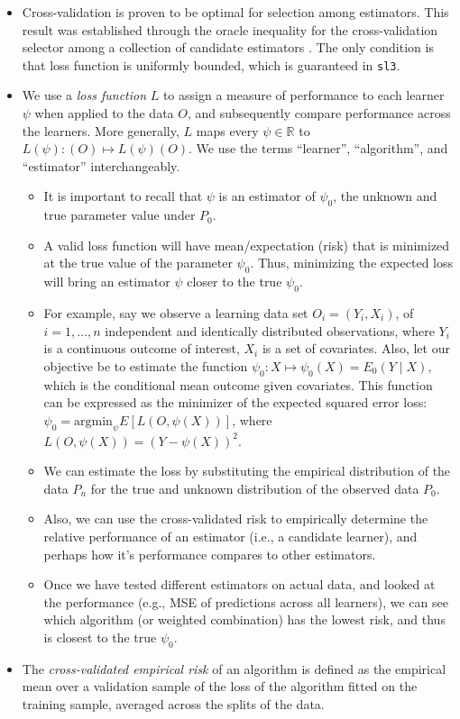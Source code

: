 \documentclass[12pt, krantz2,]{krantz}
\providecommand{\tightlist}{%
  \setlength{\itemsep}{0pt}\setlength{\parskip}{0pt}}
\theoremstyle{definition}
\theoremstyle{definition}
\theoremstyle{definition}
\newcommand{\R}{\mathbb{R}}
\newcommand{\1}{\mathbbm{1}}
\begin{document}
\begin{itemize}
\item
  Cross-validation is proven to be optimal for selection among estimators. This
  result was established through the oracle inequality for the cross-validation
  selector among a collection of candidate estimators \citep{vdl2003unified, vaart2006oracle}. The only condition is that loss function is uniformly
  bounded, which is guaranteed in \texttt{sl3}.
\item
  We use a \emph{loss function} \(L\) to assign a measure of performance to each
  learner \(\psi\) when applied to the data \(O\), and subsequently compare
  performance across the learners. More generally, \(L\) maps every \(\psi \in \R\)
  to \(L(\psi) : (O) \mapsto L(\psi)(O)\). We use the terms ``learner'',
  ``algorithm'', and ``estimator'' interchangeably.

  \begin{itemize}
  \tightlist
  \item
    It is important to recall that \(\psi\) is an estimator of \(\psi_0\), the
    unknown and true parameter value under \(P_0\).
  \item
    A valid loss function will have mean/expectation (risk) that is minimized
    at the true value of the parameter \(\psi_0\). Thus, minimizing the expected
    loss will bring an estimator \(\psi\) closer to the true \(\psi_0\).
  \item
    For example, say we observe a learning data set \(O_i=(Y_i,X_i)\), of
    \(i=1, \ldots, n\) independent and identically distributed observations,
    where \(Y_i\) is a continuous outcome of interest, \(X_i\) is a set of
    covariates. Also, let our objective be to estimate the function \(\psi_0: X \mapsto \psi_0(X) = E_0(Y \mid X)\), which is the conditional mean outcome
    given covariates. This function can be expressed as the minimizer of the
    expected squared error loss: \(\psi_0 = \text{argmin}_{\psi} E[L(O,\psi(X))]\), where \(L(O, \psi(X)) = (Y - \psi(X))^2\).
  \item
    We can estimate the loss by substituting the empirical distribution of
    the data \(P_n\) for the true and unknown distribution of the observed data
    \(P_0\).
  \item
    Also, we can use the cross-validated risk to empirically determine the
    relative performance of an estimator (i.e., a candidate learner), and
    perhaps how it's performance compares to other estimators.
  \item
    Once we have tested different estimators on actual data, and looked at
    the performance (e.g., MSE of predictions across all learners), we can
    see which algorithm (or weighted combination) has the lowest risk, and
    thus is closest to the true \(\psi_0\).
  \end{itemize}
\item
  The \emph{cross-validated empirical risk} of an algorithm is defined as the
  empirical mean over a validation sample of the loss of the algorithm fitted on
  the training sample, averaged across the splits of the data.


\end{itemize}
\end{document}
